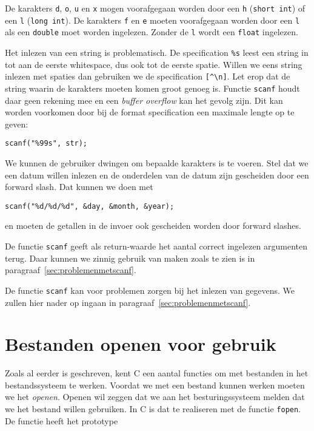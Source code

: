 De karakters \texttt{d}, \texttt{o}, \texttt{u} en \texttt{x} mogen voorafgegaan worden door een \texttt{h} (\texttt{short int}) of een \texttt{l} (\texttt{long int}). De karakters \texttt{f} en \texttt{e} moeten voorafgegaan worden door een \texttt{l} als een \texttt{double} moet worden ingelezen. Zonder de \texttt{l} wordt een \texttt{float} ingelezen.

Het inlezen van een string is problematisch. De specification \texttt{\%s} leest een string in tot aan de eerste whitespace, dus ook tot de eerste spatie. Willen we eens string inlezen met spaties dan gebruiken we de specification \texttt{[\textasciicircum\textbackslash n]}. Let erop dat de string waarin de karakters moeten komen groot genoeg is. Functie \texttt{scanf} houdt daar geen rekening mee en een \textsl{buffer overflow} kan het gevolg zijn. Dit kan worden voorkomen door bij de format specification een maximale lengte op te geven:

\begin{lstlisting}[style=lstoneline]
scanf("%99s", str);
\end{lstlisting}

We kunnen de gebruiker dwingen om bepaalde karakters is te voeren. Stel dat we een datum willen inlezen en de onderdelen van de datum zijn gescheiden door een forward slash. Dat kunnen we doen met

\begin{lstlisting}[style=lstoneline]
scanf("%d/%d/%d", &day, &month, &year);
\end{lstlisting}

en moeten de getallen in de invoer ook gescheiden worden door forward slashes.

De functie \texttt{scanf} geeft als return-waarde het aantal correct ingelezen argumenten terug. Daar kunnen we zinnig gebruik van maken zoals te zien is in paragraaf~\ref{sec:problemenmetscanf}.

De functie \texttt{scanf} kan voor problemen zorgen bij het inlezen van gegevens. We zullen hier nader op ingaan in paragraaf~\ref{sec:problemenmetscanf}.



\section{Bestanden openen voor gebruik}
Zoals al eerder is geschreven, kent C een aantal functies om met bestanden in het bestandssysteem te werken. Voordat we met een bestand kunnen werken moeten we het \textsl{openen}. Openen wil zeggen dat we aan het besturingssysteem melden dat we het bestand willen gebruiken. In C is dat te realiseren met de functie \texttt{fopen}. De functie heeft het prototype

